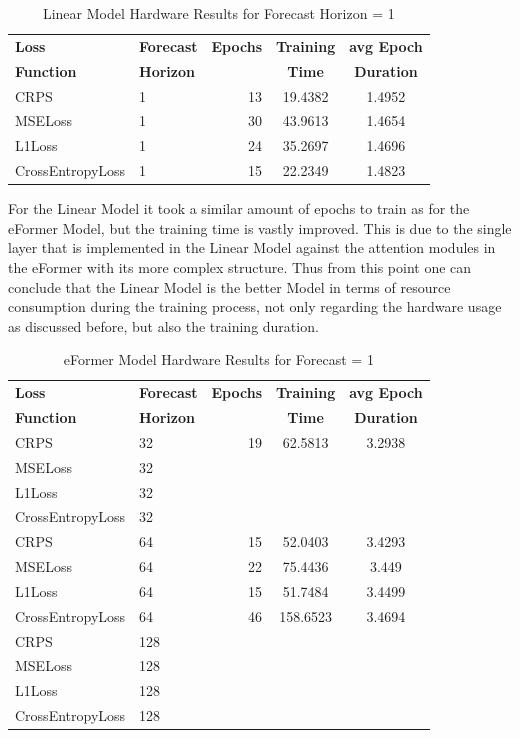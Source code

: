 \documentclass{article}
\begin{document}
\begin{table}
    \centering
    \begin{tabular}{l|l|r|S|S}
        \toprule
        \textbf{Loss} & \textbf{Forecast} & \textbf{Epochs} & \textbf{Training} & \textbf{avg Epoch} \\
        \textbf{Function} & \textbf{Horizon} &  & \textbf{Time} & \textbf{Duration} \\
        \midrule
            CRPS & 1 & 13 & 19.4382 & 1.4952 \\
        MSELoss & 1 & 30 & 43.9613 & 1.4654 \\
        L1Loss & 1 & 24 & 35.2697 & 1.4696 \\
        CrossEntropyLoss & 1 & 15 & 22.2349 & 1.4823 \\
    \bottomrule
    \end{tabular}
    \caption{Linear Model Hardware Results for Forecast Horizon = 1}
    \label{tab:linear_hardware_results_f1}
\end{table}

For the Linear Model it took a similar amount of epochs to train as for the eFormer Model, but the training time is vastly improved. This is due to the single layer that is implemented in the Linear Model against the attention modules in the eFormer with its more complex structure. Thus from this point one can conclude that the Linear Model is the better Model in terms of resource consumption during the training process, not only regarding the hardware usage as discussed before, but also the training duration. 

\begin{table}
    \centering
    \begin{tabular}{l|l|r|S|S}
        \toprule
        \textbf{Loss} & \textbf{Forecast} & \textbf{Epochs} & \textbf{Training} & \textbf{avg Epoch} \\
        \textbf{Function} & \textbf{Horizon} &  & \textbf{Time} & \textbf{Duration} \\
        \midrule
            CRPS & 32 & 19 & 62.5813 & 3.2938 \\
        MSELoss & 32 &  &  &  \\
        L1Loss & 32 &  &  &  \\
        CrossEntropyLoss & 32 &  &  &  \\
        \midrule
        CRPS & 64 & 15 & 52.0403 & 3.4293 \\
        MSELoss & 64 & 22 & 75.4436 & 3.449 \\
        L1Loss & 64 & 15 & 51.7484 & 3.4499 \\
        CrossEntropyLoss & 64 & 46 & 158.6523 & 3.4694 \\
        \midrule
        CRPS & 128 &  &  &  \\
        MSELoss & 128 &  &  &  \\
        L1Loss & 128 &  &  &  \\
        CrossEntropyLoss & 128 &  &  &  \\
    \bottomrule
    \end{tabular}
    \caption{eFormer Model Hardware Results for Forecast = 1}
    \label{tab:eformer_hardware_results_f1}
\end{table}
\end{document}
